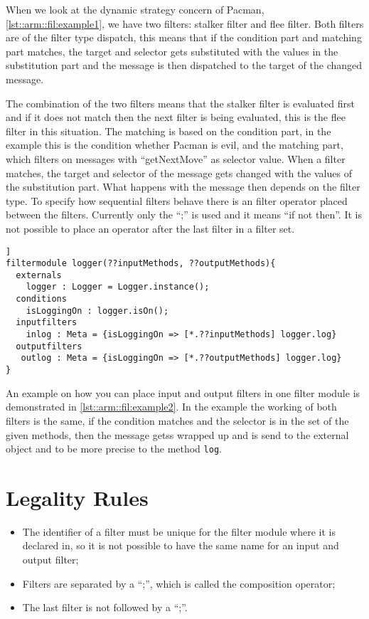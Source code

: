 When we look at the dynamic strategy concern of Pacman, \autoref{lst::arm::fil:example1}, we have two filters: stalker filter and flee filter. 
Both filters are of the filter type dispatch, this means that if the condition part and matching part matches, the target and selector gets substituted with the values in the substitution part and the message is then dispatched to the target of the changed message.

The combination of the two filters means that the stalker filter is evaluated first and if it does not match then the next filter is being evaluated, this is the flee filter in this situation.
The matching is based on the condition part, in the example this is the condition whether Pacman is evil, and the matching part, which filters on messages with ``getNextMove'' as selector value.
When a filter matches, the target and selector of the message gets changed with the values of the substitution part. 
What happens with the message then depends on the filter type.
To specify how sequential filters behave there is an filter operator placed between the filters. 
Currently only the ``;'' is used and it means ``if not then''.  
It is not possible to place an operator after the last filter in a filter set.

\begin{lstlisting}[caption = {Custom logging filter module}, label=lst::arm::fil:example2,style = listing, language = ComposeStar,float=[tpb]]
filtermodule logger(??inputMethods, ??outputMethods){
  externals
    logger : Logger = Logger.instance();
  conditions
    isLoggingOn : logger.isOn();
  inputfilters
    inlog : Meta = {isLoggingOn => [*.??inputMethods] logger.log}
  outputfilters
   outlog : Meta = {isLoggingOn => [*.??outputMethods] logger.log}
}
\end{lstlisting}

An example on how you can place input and output filters in one filter module is demonstrated in \autoref{lst::arm::fil:example2}. 
In the example the working of both filters is the same, if the condition matches and the selector is in the set of the given methods, then the message getss wrapped up and is send to the external object and to be more precise to the method \lstinline|log|.

\section{Legality Rules}
\begin{itemize}[noitemsep]
\item The identifier of a filter must be unique for the filter module where it is declared in, so it is not possible to have the same name for an input and output filter;
\item Filters are separated by a ``;'', which is called the composition operator;
\item The last filter is not followed by a ``;''.
\end{itemize}

